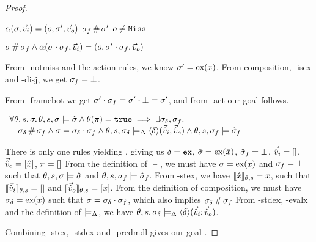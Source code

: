 \begin{proof}

\pfassume \begin{hypvlist}
 $\alpha(\sigma,\vec{v}_i)=(o,\sigma',\vec{v}_o)$
 $\sigma_f\operatorname{\#}\sigma'$
 $o\neq\texttt{Miss}$
\end{hypvlist}
\pfprove \begin{goalvlist}
 $\sigma \operatorname{\#} \sigma_f \land \alpha(\sigma\cdot\sigma_f, \vec{v}_i)=(o, \sigma'\cdot\sigma_f, \vec{v}_o)$	
\end{goalvlist}
\begin{hypvlist}
 From \hyp{notmiss} and the action rules, we know $\sigma'=\text{ex}(x)$.
 From composition, \hyp{isex} and \hyp{disj}, we get $\sigma_f=\bot$.
\end{hypvlist}
From \hyp{framebot} we get $\sigma'\cdot\sigma_f=\sigma'\cdot\bot=\sigma'$, and from \hyp{act} our goal  follows.


\pfassume \begin{hypvlist}
 
\end{hypvlist}
\pfprove \begin{goalvlist}
 $\begin{array}{l}
\forall \theta,s,\sigma\ldotp \theta,s,\sigma\models \hat{\sigma} \land \theta(\pi)=\texttt{true} \implies \exists \sigma_\delta, \sigma_f \ldotp\\
\quad  \sigma_\delta\operatorname{\#}\sigma_f \land \sigma=\sigma_\delta\cdot\sigma_f \land \theta, s, \sigma_\delta \models_{\Delta} \left<\delta\right>\!(\vec{\hat{v}}_i;\vec{\hat{v}}_o) \land \theta,s,\sigma_f\models \hat{\sigma}_f 
\end{array}$
\end{goalvlist}
\begin{hypvlist}
 There is only one \consume{} rules yielding \Ok, giving us $\delta=\texttt{ex}$, $\hat{\sigma}=\text{ex}(\hat{x})$, $\hat{\sigma}_f=\bot$, $\vec{\hat{v}}_i=[]$, $\vec{\hat{v}}_o=[\hat{x}]$, $\pi=[]$
 From the definition of $\models$, we must have $\sigma=\text{ex}(x)$ and $\sigma_f=\bot$ such that $\theta,s,\sigma\models\hat{\sigma}$ and $\theta,s,\sigma_f\models\hat{\sigma}_f$.
 From \hyp{stex}, we have $\llbracket\hat{x}\rrbracket_{\theta,s}=x$, such that $\llbracket\vec{\hat{v}}_i\rrbracket_{\theta,s}=[]$ and $\llbracket\vec{\hat{v}}_o\rrbracket_{\theta,s}=[x]$.
 From the definition of composition, we must have $\sigma_\delta=\text{ex}(x)$ such that $\sigma=\sigma_\delta\cdot\sigma_f$, which also implies $\sigma_\delta\operatorname{\#}\sigma_f$
 From \hyp{stdex}, \hyp{evalx} and the definition of $\models_{\Delta}$, we have $\theta,s,\sigma_\delta\models_{\Delta} \left<\delta\right>\!(\vec{\hat{v}}_i;\vec{\hat{v}}_o)$.
\end{hypvlist}
Combining \hyp{stex}, \hyp{stdex} and \hyp{predmdl} gives our goal .


\end{proof}
